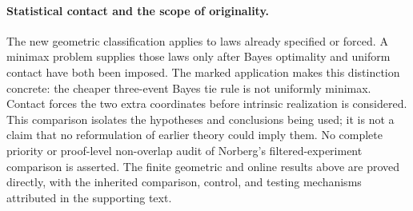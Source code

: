 \paragraph{Statistical contact and the scope of originality.}
The new geometric classification applies to laws already specified or
forced. A minimax problem supplies those laws only after Bayes
optimality and uniform contact have both been imposed. The marked
application makes this distinction concrete: the cheaper three-event
Bayes tie rule is not uniformly minimax. Contact forces the two extra
coordinates before intrinsic realization is considered. This comparison
isolates the hypotheses and conclusions being used; it is not a claim
that no reformulation of earlier theory could imply them. No complete
priority or proof-level non-overlap audit of Norberg's filtered-experiment
comparison \cite{Norberg} is asserted. The finite geometric and online
results above are proved directly, with the inherited comparison,
control, and testing mechanisms attributed in the supporting text.
